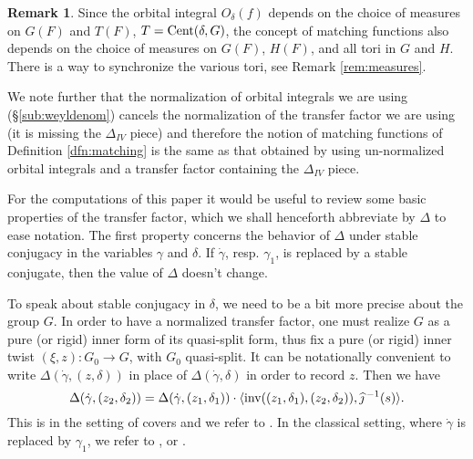 \documentclass{article}
\theoremstyle{definition}
\newtheorem{rem}[thm]{Remark}
\numberwithin{equation}{section}
\renewcommand{\-}{\hyp{}}
\begin{document}
\begin{rem} \label{rem:matchmeasures}
	Since the orbital integral $O_\delta(f)$ depends on the choice of measures on $G(F)$ and $T(F)$, $T=\textrm{Cent}(\delta,G)$, the concept of matching functions also depends on the choice of measures on $G(F)$, $H(F)$, and all tori in $G$ and $H$. There is a way to synchronize the various tori, see Remark \ref{rem:measures}.

	We note further that the normalization of orbital integrals we are using (\S\ref{sub:weyldenom}) cancels the normalization of the transfer factor we are using (it is missing the $\Delta_{IV}$ piece) and therefore the notion of matching functions of Definition \ref{dfn:matching} is the same as that obtained by using un-normalized orbital integrals and a transfer factor containing the $\Delta_{IV}$ piece.
\end{rem}

For the computations of this paper it would be useful to review some basic properties of the transfer factor, which we shall henceforth abbreviate by $\Delta$ to ease notation. The first property concerns the behavior of $\Delta$ under stable conjugacy in the variables $\gamma$ and $\delta$. If $\dot\gamma$, resp. $\gamma_1$, is replaced by a stable conjugate, then the value of $\Delta$ doesn't change. 

To speak about stable conjugacy in $\delta$, we need to be a bit more precise about the group $G$. In order to have a normalized transfer factor, one must realize $G$ as a pure (or rigid) inner form of its quasi-split form, thus fix a pure (or rigid) inner twist $(\xi,z) : G_0 \to G$, with $G_0$ quasi-split. It can be notationally convenient to write $\Delta(\dot\gamma,(z,\delta))$ in place of $\Delta(\dot\gamma,\delta)$ in order to record $z$. Then we have 
\begin{equation} \label{eq:tfstab}
	\Delta(\dot\gamma,(z_2,\delta_2)) = \Delta(\dot\gamma,(z_1,\delta_1)) \cdot \langle\textrm{inv}((z_1,\delta_1),(z_2,\delta_2)),\widehat \jmath\,^{-1}(s)\rangle.
\end{equation}
This is in the setting of covers and we refer to \cite[Lemma 4.3.1]{KalHDC}. In the classical setting, where $\dot\gamma$ is replaced by $\gamma_1$, we refer to \cite[Definitions 4.2.7,4.3.11]{KalIMS}, or \cite[\S4.1]{LS87}.
\end{document}
